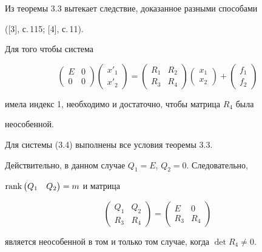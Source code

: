 Из теоремы 3.3 вытекает следствие, доказанное разными способами 


([3], с.\,115; [4], с.\,11). 


 


\begin{cors} 


Для того чтобы система 


\begin{equation} 


\begin{pmatrix}E & 0 \\ 0 & 0 \end{pmatrix} 


\begin{pmatrix}x'_1 \\ x'_2 \end{pmatrix}= 


\begin{pmatrix}R_1 & R_2 \\ R_3 & R_4 \end{pmatrix} 


\begin{pmatrix}x_1\\ x_2 \end{pmatrix}+ 


\begin{pmatrix}f_1 \\ f_2 \end{pmatrix} 


\end{equation} 


имела индекс 1, необходимо и достаточно, чтобы матрица $R_4$ была 


неособенной. 


\end{cors} 


 


\begin{pf} 


Для системы (3.4) выполнены все условия теоремы 3.3. 


Действительно, в данном случае $Q_1=E$, $Q_2=0$. Следовательно, 


$\operatorname{rank}\begin{pmatrix}Q_1 & Q_2\end{pmatrix}=m$ и матрица 


$$ 


\begin{pmatrix}Q_1 & Q_2 \\ R_3 & R_4 \end{pmatrix}= 


\begin{pmatrix}E & 0 \\ R_3 & R_4 \end{pmatrix} 


$$ 


является неособенной в том и только том случае, когда $\det R_4\ne0$. 


\end{pf}


